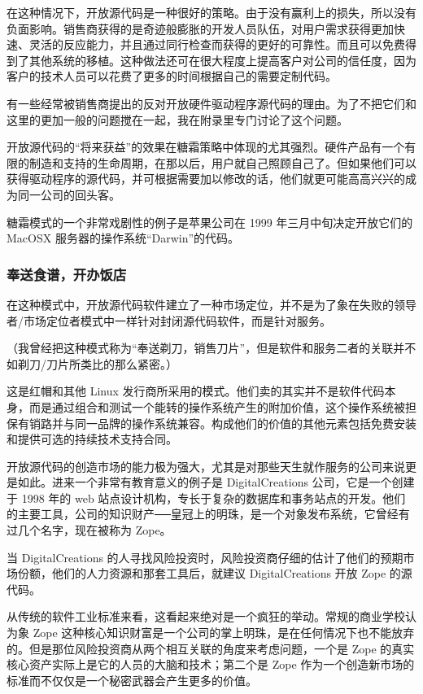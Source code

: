 在这种情况下，开放源代码是一种很好的策略。由于没有赢利上的损失，所以没有负面影响。销售商获得的是奇迹般膨胀的开发人员队伍，对用户需求获得更加快速、灵活的反应能力，并且通过同行检查而获得的更好的可靠性。而且可以免费得到了其他系统的移植。这种做法还可在很大程度上提高客户对公司的信任度，因为客户的技术人员可以花费了更多的时间根据自己的需要定制代码。


有一些经常被销售商提出的反对开放硬件驱动程序源代码的理由。为了不把它们和这里的更加一般的问题搅在一起，我在附录里专门讨论了这个问题。


开放源代码的“将来获益”的效果在糖霜策略中体现的尤其强烈。硬件产品有一个有限的制造和支持的生命周期，在那以后，用户就自己照顾自己了。但如果他们可以获得驱动程序的源代码，并可根据需要加以修改的话，他们就更可能高高兴兴的成为同一公司的回头客。


糖霜模式的一个非常戏剧性的例子是苹果公司在 1999 年三月中旬决定开放它们的 MacOSX 服务器的操作系统“Darwin”的代码。

\subsubsection{奉送食谱，开办饭店}
在这种模式中，开放源代码软件建立了一种市场定位，并不是为了象在失败的领导者/市场定位者模式中一样针对封闭源代码软件，而是针对服务。


（我曾经把这种模式称为“奉送剃刀，销售刀片”，但是软件和服务二者的关联并不如剃刀/刀片所类比的那么紧密。）


这是红帽和其他 Linux 发行商所采用的模式。他们卖的其实并不是软件代码本身，而是通过组合和测试一个能转的操作系统产生的附加价值，这个操作系统被担保有销路并与同一品牌的操作系统兼容。构成他们的价值的其他元素包括免费安装和提供可选的持续技术支持合同。


开放源代码的创造市场的能力极为强大，尤其是对那些天生就作服务的公司来说更是如此。进来一个非常有教育意义的例子是 DigitalCreations 公司，它是一个创建于 1998 年的 web 站点设计机构，专长于复杂的数据库和事务站点的开发。他们的主要工具，公司的知识财产──皇冠上的明珠，是一个对象发布系统，它曾经有过几个名字，现在被称为 Zope。


当 DigitalCreations 的人寻找风险投资时，风险投资商仔细的估计了他们的预期市场份额，他们的人力资源和那套工具后，就建议 DigitalCreations 开放 Zope 的源代码。


从传统的软件工业标准来看，这看起来绝对是一个疯狂的举动。常规的商业学校认为象 Zope 这种核心知识财富是一个公司的掌上明珠，是在任何情况下也不能放弃的。但是那位风险投资商从两个相互关联的角度来考虑问题，一个是 Zope 的真实核心资产实际上是它的人员的大脑和技术；第二个是 Zope 作为一个创造新市场的标准而不仅仅是一个秘密武器会产生更多的价值。



